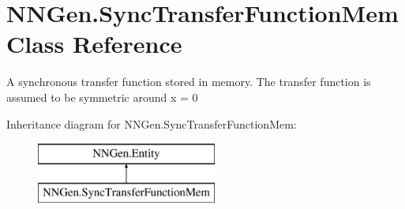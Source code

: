 \hypertarget{class_n_n_gen_1_1_sync_transfer_function_mem}{}\section{N\+N\+Gen.\+Sync\+Transfer\+Function\+Mem Class Reference}
\label{class_n_n_gen_1_1_sync_transfer_function_mem}


A synchronous transfer function stored in memory. The transfer function is assumed to be symmetric around x = 0  


Inheritance diagram for N\+N\+Gen.\+Sync\+Transfer\+Function\+Mem\+:\begin{figure}[H]
\begin{center}
\leavevmode
\includegraphics[height=2.000000cm]{class_n_n_gen_1_1_sync_transfer_function_mem}
\end{center}
\end{figure}
